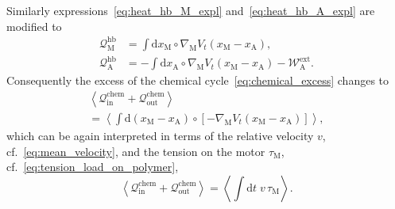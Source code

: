 \documentclass[aps,pre,twocolumn,showpacs,showkeys,superscriptaddress,floatfix]{revtex4-1}
\newcommand{\rmd}{{\mathrm d}}
\begin{document}
Similarly expressions~\eqref{eq:heat_hb_M_expl} and~\eqref{eq:heat_hb_A_expl} are modified to
\begin{align*}
{\mathcal Q}_\text{M}^\text{hb} 
&= \int \rmd x_\text{M} \circ \nabla_\text{M} V_t(x_\text{M} - x_\text{A} ) ,
\\
{\mathcal Q}_\text{A}^\text{hb} 
&= - \int \rmd x_\text{A} \circ \nabla_\text{M} V_t(x_\text{M} - x_\text{A} ) - {\mathcal W}_\text{A}^\text{ext} .
\end{align*} 
Consequently the excess of the chemical cycle~\eqref{eq:chemical_excess} changes to 
\begin{multline*}
\left\langle 
{\mathcal Q}_\text{in}^\text{chem} + {\mathcal Q}_\text{out}^\text{chem} 
\right\rangle 
\\
= 
\left\langle 
\int \rmd \left( x_\text{M} - x_\text{A} \right) \circ \left[ - \nabla_\text{M} V_t( x_\text{M} - x_\text{A} ) \right]
\right\rangle ,
\end{multline*} 
which can be again interpreted in terms of the relative velocity $v$, cf.~\eqref{eq:mean_velocity}, 
and the tension on the motor $\tau_\text{M}$, cf.~\eqref{eq:tension_load_on_polymer},  
\begin{equation}
\left\langle 
{\mathcal Q}_\text{in}^\text{chem} + {\mathcal Q}_\text{out}^\text{chem} 
\right\rangle 
= \left\langle \int \rmd t \; v \, \tau_\text{M} \right\rangle .
\label{eq:chemical_excess_poly}
\end{equation}
\end{document}
